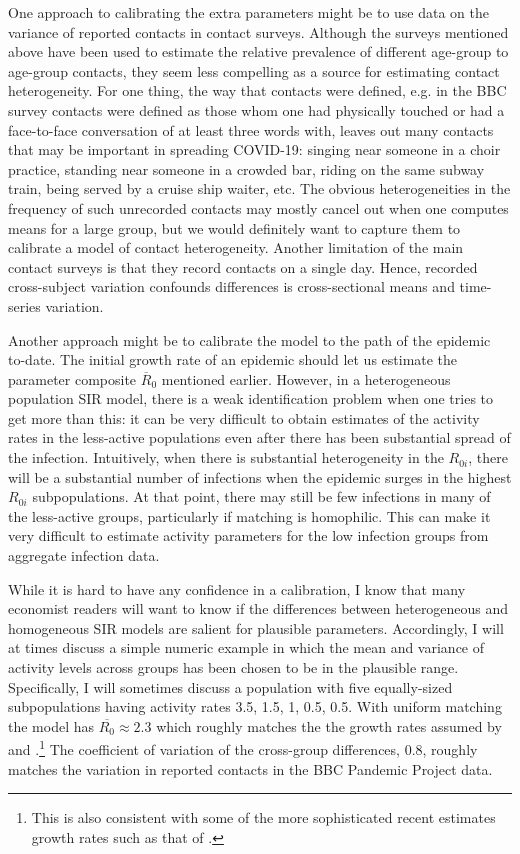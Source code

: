 \documentclass[11pt]{article}
\begin{document}
One approach to calibrating the extra parameters might be
to use data on the variance of reported contacts in contact surveys. Although the surveys mentioned above have been used to estimate the relative prevalence of different age-group to age-group contacts, they seem less compelling as a source for estimating contact heterogeneity. For one thing, the way that contacts were defined, e.g. in the BBC survey contacts were defined as those whom one had physically touched or had a face-to-face conversation of at least three words with, leaves out many contacts that may be important in spreading COVID-19: singing near someone in a choir practice, standing near someone in a crowded bar, riding on the same subway train, being served by a cruise ship waiter, etc. The obvious heterogeneities in the frequency of such unrecorded contacts may mostly cancel out when one computes means for a large group, but we would definitely want to capture them to calibrate a model of contact heterogeneity. Another limitation of the main contact surveys is that they record contacts on a single day. Hence, recorded cross-subject variation confounds differences is cross-sectional means and
time-series variation.

Another approach might be to calibrate the model to the path of the epidemic to-date. The initial growth rate of an epidemic should let us estimate the parameter composite $\overline{R}_0$ mentioned earlier. However, in a heterogeneous population SIR model, there is a weak identification problem when one tries to
get more than this: 
it can be very difficult to obtain estimates of the activity rates in the less-active populations even after there has been substantial spread of the infection. Intuitively, when there is substantial heterogeneity in the $R_{0i}$, there will be a substantial number of infections when the epidemic surges in the highest $R_{0i}$ subpopulations. At that point, there may still be few infections in many of the less-active groups, particularly if matching is homophilic. This can make it very difficult to estimate activity parameters for the low infection groups from aggregate infection data.

While it is hard to have any confidence in a calibration, I know that many economist readers will want to know if the differences between heterogeneous and homogeneous SIR models are salient for plausible parameters. Accordingly, I will at times discuss a simple numeric example in which the mean and variance of activity levels across groups has been chosen to be in the plausible range. Specifically, I will sometimes discuss a population with five equally-sized subpopulations having activity rates 3.5, 1.5, 1, 0.5, 0.5. With uniform matching the model has $\overline{R_0}\approx 2.3$ which roughly matches the the growth rates assumed by \citet{ferguson2020impact} and \citet{acemoglu2020multi}.\footnote{This is also consistent with some of the more sophisticated recent estimates growth rates such as that of 
 \citet{miller2020full}.} The coefficient of variation of the cross-group differences, 0.8, roughly matches the variation in reported contacts in the BBC Pandemic Project data.
\end{document}
